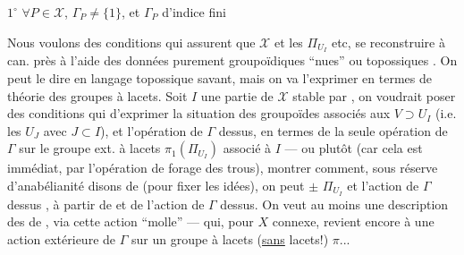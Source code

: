 \textcircled{\(1^\circ\)} $\forall P\in\mathcal{X}$, $\Gamma_P\ne\{1\}$, et $\Gamma_P$ d'indice fini  

Nous voulons des conditions qui assurent que $\mathcal{X}$ et les $\Pi_{U_I}$  etc,  se reconstruire à   can. près à l'aide des données purement groupoïdiques ``nues'' ou topossiques  .  On peut le dire en langage topossique savant, mais on va l'exprimer en termes de théorie des groupes à lacets. Soit $I$ une partie de $\mathcal{X}$ stable par , on voudrait poser des conditions qui   d'exprimer  la situation des groupoïdes  associés aux $V\supset U_I$ (i.e. les $U_J$ avec $J\subset I$),  et l'opération de $\Gamma$ dessus, en termes de la  seule opération de $\Gamma$ sur le groupe ext. à lacets  $\pi_1(\Pi_{U_I})$ associé à $I$ ---
\margin{\unsure{$\rightsquigarrow$|$\longrightarrow$}}
ou plutôt (car cela est immédiat, par l'opération de forage des trous),  montrer comment,
sous réserve d'anabélianité \unsure{$\zeta$|$\xi$} disons de  (pour fixer les idées), on peut $\pm$  $\Pi_{U_I}$ et l'action de $\Gamma$ dessus ,
à partir de   et de l'action de $\Gamma$ dessus.
On veut au moins une description  des  de ,  via
cette action ``molle'' --- qui, pour $X$ connexe, revient encore à une action extérieure de $\Gamma$ sur un groupe à lacets (\uline{sans} lacets!) $\pi$...

